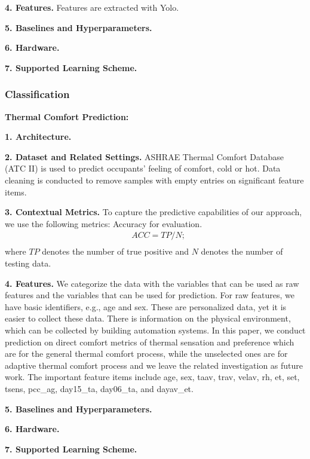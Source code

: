 \textbf{4. Features.}
Features are extracted with Yolo. 

\textbf{5. Baselines and Hyperparameters.}


\textbf{6. Hardware.}

\textbf{7. Supported Learning Scheme.}


\subsubsection{Classification}




\textbf{Thermal Comfort Prediction:} 

\textbf{1. Architecture.}

\textbf{2. Dataset and Related Settings.}
ASHRAE Thermal Comfort Database (ATC II) is used to predict occupants' feeling of comfort, cold or hot. Data cleaning is conducted to remove samples with empty entries on significant feature items.

\textbf{3. Contextual Metrics.} 
To capture the predictive capabilities of our approach, we use the following metrics: Accuracy for evaluation.
\noindent
\begin{equation*}
\begin{split}
&ACC = TP / N; \\
\end{split}
\end{equation*}
where $TP$ denotes the number of true positive and $N$ denotes the number of testing data. 

\textbf{4. Features.} 
We categorize the data with the variables that can be used as raw features and the variables that can be used for prediction. For raw features, we have basic identifiers, e.g., age and sex. These are personalized data, yet it is easier to collect these data. There is information on the physical environment, which can be collected by building automation systems. In this paper, we conduct prediction on direct comfort metrics of thermal sensation and preference which are for the general thermal comfort process, while the unselected ones are for adaptive thermal comfort process and we leave the related investigation as future work. The important feature items include age, sex, taav, trav, velav, rh, et, set, tsens, pcc\_ag, day15\_ta, day06\_ta, and dayav\_et. 

\textbf{5. Baselines and Hyperparameters.}

\textbf{6. Hardware.}

\textbf{7. Supported Learning Scheme.}

